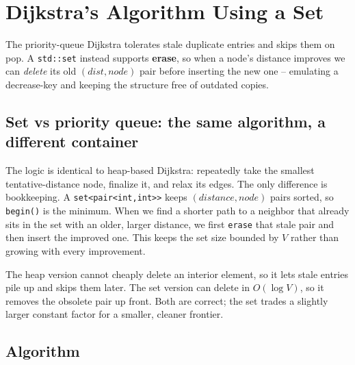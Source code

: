 \section{Dijkstra's Algorithm Using a Set}
\label{sec:graph-dijkstra-set}


\begin{patternbox}
The priority-queue Dijkstra tolerates stale duplicate entries and skips
them on pop. A \texttt{std::set} instead supports \textbf{erase}, so
when a node's distance improves we can \emph{delete} its old
$(\textit{dist},\textit{node})$ pair before inserting the new one --
emulating a decrease-key and keeping the structure free of outdated
copies.
\end{patternbox}

\subsection*{Set vs priority queue: the same algorithm, a different container}

The logic is identical to heap-based Dijkstra: repeatedly take the
smallest tentative-distance node, finalize it, and relax its edges. The
only difference is bookkeeping. A \texttt{set<pair<int,int>>} keeps
$(\textit{distance},\textit{node})$ pairs sorted, so
\texttt{begin()} is the minimum. When we find a shorter path to a
neighbor that already sits in the set with an older, larger distance, we
first \texttt{erase} that stale pair and then insert the improved one.
This keeps the set size bounded by $V$ rather than growing with every
improvement.

\begin{ideabox}
The heap version cannot cheaply delete an interior element, so it lets
stale entries pile up and skips them later. The set version can delete
in $O(\log V)$, so it removes the obsolete pair up front. Both are
correct; the set trades a slightly larger constant factor for a smaller,
cleaner frontier.
\end{ideabox}

\subsection*{Algorithm}

